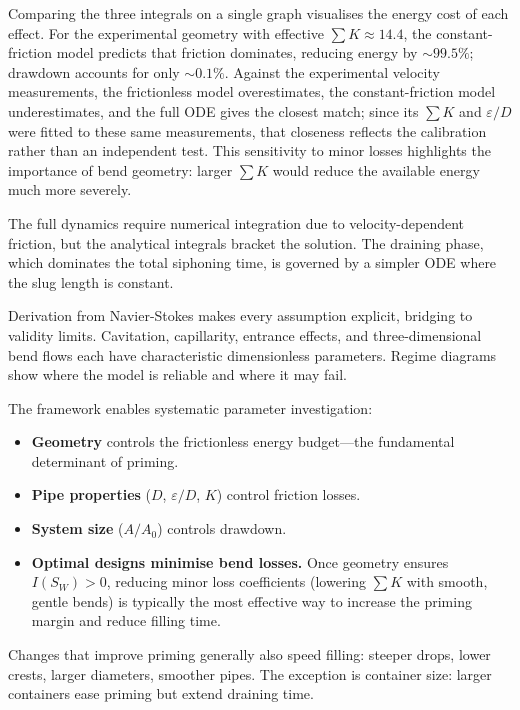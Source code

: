 \documentclass[11pt]{article}
\begin{document}
Comparing the three integrals on a single graph visualises the energy cost of each effect. For the experimental geometry with effective $\sum K \approx 14.4$, the constant-friction model predicts that friction dominates, reducing energy by $\sim 99.5\%$; drawdown accounts for only $\sim 0.1\%$. Against the experimental velocity measurements, the frictionless model overestimates, the constant-friction model underestimates, and the full ODE gives the closest match; since its $\sum K$ and $\varepsilon/D$ were fitted to these same measurements, that closeness reflects the calibration rather than an independent test. This sensitivity to minor losses highlights the importance of bend geometry: larger $\sum K$ would reduce the available energy much more severely.

The full dynamics require numerical integration due to velocity-dependent friction, but the analytical integrals bracket the solution. The draining phase, which dominates the total siphoning time, is governed by a simpler ODE where the slug length is constant.

Derivation from Navier-Stokes makes every assumption explicit, bridging to validity limits. Cavitation, capillarity, entrance effects, and three-dimensional bend flows each have characteristic dimensionless parameters. Regime diagrams show where the model is reliable and where it may fail.

The framework enables systematic parameter investigation:
\begin{itemize}[nosep,leftmargin=2em]
  \item \textbf{Geometry} controls the frictionless energy budget---the fundamental determinant of priming.
  \item \textbf{Pipe properties} ($D$, $\varepsilon/D$, $K$) control friction losses.
  \item \textbf{System size} ($A/A_0$) controls drawdown.
  \item \textbf{Optimal designs minimise bend losses.} Once geometry ensures $I(S_W) > 0$, reducing minor loss coefficients (lowering $\sum K$ with smooth, gentle bends) is typically the most effective way to increase the priming margin and reduce filling time.
\end{itemize}

Changes that improve priming generally also speed filling: steeper drops, lower crests, larger diameters, smoother pipes. The exception is container size: larger containers ease priming but extend draining time.
\end{document}
